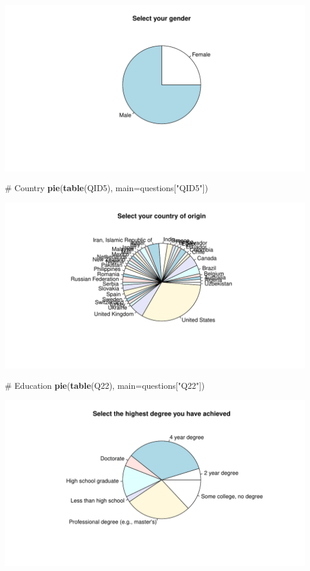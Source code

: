 \documentclass[12pt, titlepage]{article}
\newenvironment{Shaded}{\begin{snugshade}}{\end{snugshade}}
\newcommand{\KeywordTok}[1]{\textcolor[rgb]{0.12,0.11,0.11}{\textbf{#1}}}
\newcommand{\DataTypeTok}[1]{\textcolor[rgb]{0.00,0.34,0.68}{#1}}
\newcommand{\StringTok}[1]{\textcolor[rgb]{0.75,0.01,0.01}{#1}}
\newcommand{\CommentTok}[1]{\textcolor[rgb]{0.54,0.53,0.53}{#1}}
\newcommand{\NormalTok}[1]{\textcolor[rgb]{0.12,0.11,0.11}{#1}}
\begin{document}
\includegraphics{analysis_survey_files/figure-latex/unnamed-chunk-2-2.pdf}

\begin{Shaded}
\begin{Highlighting}[]
\CommentTok{# Country}
\KeywordTok{pie}\NormalTok{(}\KeywordTok{table}\NormalTok{(QID5), }\DataTypeTok{main=}\NormalTok{questions[}\StringTok{"QID5"}\NormalTok{])}
\end{Highlighting}
\end{Shaded}

\includegraphics{analysis_survey_files/figure-latex/unnamed-chunk-2-3.pdf}

\begin{Shaded}
\begin{Highlighting}[]
\CommentTok{# Education}
\KeywordTok{pie}\NormalTok{(}\KeywordTok{table}\NormalTok{(Q22), }\DataTypeTok{main=}\NormalTok{questions[}\StringTok{"Q22"}\NormalTok{])}
\end{Highlighting}
\end{Shaded}

\includegraphics{analysis_survey_files/figure-latex/unnamed-chunk-2-4.pdf}
\end{document}
